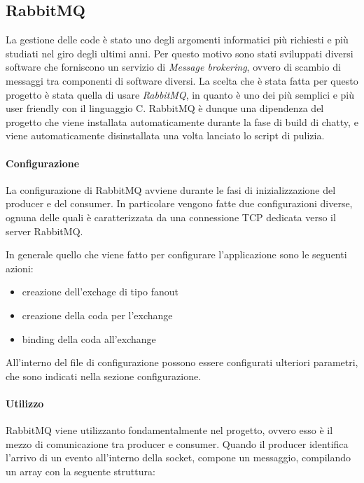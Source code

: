 \documentclass[]{article}
\begin{document}
\subsection{RabbitMQ}
La gestione delle code \`e  stato uno degli argomenti informatici pi\`u richiesti e pi\`u studiati nel giro degli ultimi anni.
Per questo motivo sono stati sviluppati diversi software che forniscono un servizio di \textit{Message brokering},
ovvero di scambio di messaggi tra componenti di software diversi.
La scelta che \`e stata fatta per questo progetto \`e stata quella di usare \textit{RabbitMQ}, in quanto \`e uno dei 
pi\`u semplici e pi\`u user friendly con il linguaggio C.
RabbitMQ \`e dunque una dipendenza del progetto che viene installata automaticamente durante la fase di build di
chatty, e viene automaticamente disinstallata una volta lanciato lo script di pulizia.

\paragraph{Configurazione}
La configurazione di RabbitMQ avviene durante le fasi di inizializzazione del producer e del consumer.
In particolare vengono fatte due configurazioni diverse, ognuna delle quali \`e caratterizzata da una
connessione TCP dedicata verso il server RabbitMQ.

In generale quello che viene fatto per configurare l'applicazione sono le seguenti azioni:
\begin{itemize}
	\item creazione dell'exchage di tipo fanout
	\item creazione della coda per l'exchange
	\item binding della coda all'exchange
\end{itemize}
All'interno del file di configurazione possono essere configurati ulteriori parametri, che sono indicati
nella sezione configurazione.

\paragraph{Utilizzo}
RabbitMQ viene utilizzanto fondamentalmente nel progetto, ovvero esso \`e il mezzo di comunicazione tra
producer e consumer.
Quando il producer identifica l'arrivo di un evento all'interno della socket, compone un messaggio, 
compilando un array con la seguente struttura:
\end{document}
